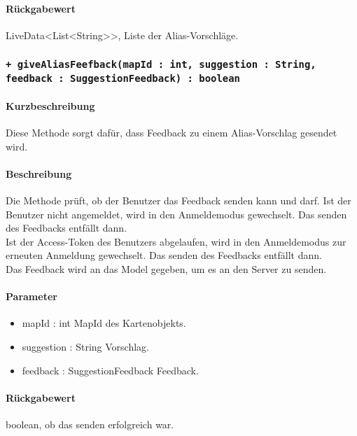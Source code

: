 \paragraph*{Rückgabewert}
LiveData<List<String>>, Liste der Alias-Vorschläge.

\subsubsection{\texttt{+ giveAliasFeefback(mapId : int, suggestion : String, feedback : SuggestionFeedback) : boolean}}%
\paragraph*{Kurzbeschreibung}
Diese Methode sorgt dafür, dass Feedback zu einem Alias-Vorschlag gesendet wird.
\paragraph*{Beschreibung}
Die Methode prüft, ob der Benutzer das Feedback senden kann und darf.
Ist der Benutzer nicht angemeldet, wird in den Anmeldemodus gewechselt. Das senden des Feedbacks entfällt dann.\\
Ist der Access-Token des Benutzers abgelaufen, wird in den Anmeldemodus zur erneuten Anmeldung gewechselt. Das senden des Feedbacks entfällt dann.\\
Das Feedback wird an das Model gegeben, um es an den Server zu senden.
\paragraph*{Parameter}
\begin{itemize}
    \item mapId : int MapId des Kartenobjekts.
    \item suggestion : String Vorschlag. 
    \item feedback : SuggestionFeedback Feedback.
\end{itemize}
\paragraph*{Rückgabewert}
boolean, ob das senden erfolgreich war.